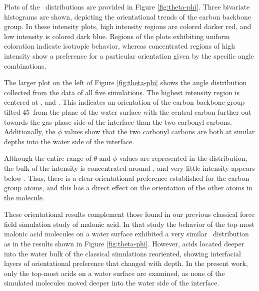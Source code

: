 Plots of the \thetaphi~distributions are provided in Figure \ref{fig:theta-phi}. Three bivariate histograms are shown, depicting the orientational trends of the carbon backbone group. In these intensity plots, high intensity regions are colored darker red, and low intensity is colored dark blue. Regions of the plots exhibiting uniform coloration indicate isotropic behavior, whereas concentrated regions of high intensity show a preference for a particular orientation given by the specific angle combinations.

The larger plot on the left of Figure \ref{fig:theta-phi} shows the angle distribution collected from the data of all five simulations. The highest intensity region is centered at \degr, and \degr. This indicates an orientation of the carbon backbone group tilted 45\degr~from the plane of the water surface with the central carbon further out towards the gas-phase side of the interface than the two carbonyl carbons. Additionally, the $\phi$ values show that the two carbonyl carbons are both at similar depths into the water side of the interface.

Although the entire range of $\theta$ and $\phi$ values are represented in the distribution, the bulk of the intensity is concentrated around \degr, and very little intensity appears below \degr. Thus, there is a clear orientational preference established for the carbon group atoms, and this has a direct effect on the orientation of the other atoms in the molecule.

These orientational results complement those found in our previous classical force field simulation study of malonic acid.\cite{Blower2012} In that study the behavior of the top-most malonic acid molecules on a water surface exhibited a very similar \thetaphi~distribution as in the results shown in Figure \ref{fig:theta-phi}. However, acids located deeper into the water bulk of the classical simulations reoriented, showing interfacial layers of orientational preference that changed with depth. In the present work, only the top-most acids on a water surface are examined, as none of the simulated molecules moved deeper into the water side of the interface.

